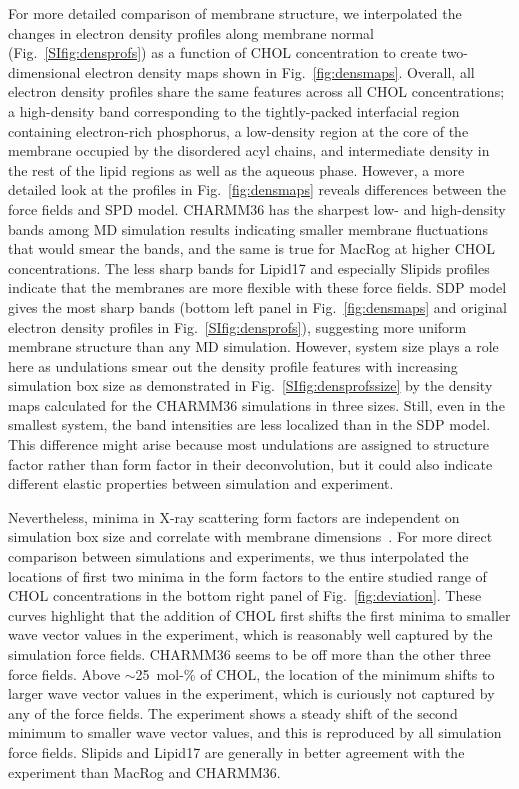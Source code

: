 \documentclass[journal=jctcce]{achemso}
\begin{document}
For more detailed comparison of membrane structure, we interpolated the changes in electron density profiles along membrane normal (Fig.~\ref{SIfig:densprofs}) as a function of CHOL concentration to create two-dimensional electron density maps shown in Fig.~\ref{fig:densmaps}. Overall, all electron density profiles share the same features across all CHOL concentrations; a high-density band corresponding to the tightly-packed interfacial region containing electron-rich phosphorus, a low-density region at the core of the membrane occupied by the disordered acyl chains, and intermediate density in the rest of the lipid regions as well as the aqueous phase. However, a more detailed look at the profiles in Fig.~\ref{fig:densmaps} reveals differences between the force fields and SPD model. CHARMM36 has the sharpest low- and high-density bands among MD simulation results indicating smaller membrane fluctuations that would smear the bands, and the same is true for MacRog at higher CHOL concentrations. The less sharp bands for Lipid17 and especially Slipids profiles indicate that the membranes are more flexible with these force fields. SDP model gives the most sharp bands (bottom left panel in Fig.~\ref{fig:densmaps} and original electron density profiles in Fig.~\ref{SIfig:densprofs}), suggesting more uniform membrane structure than any MD simulation. However, system size plays a role here as  undulations smear out the density profile features with increasing simulation box size as demonstrated in Fig.~\ref{SIfig:densprofssize} by the density maps calculated for the CHARMM36 simulations in three sizes.  Still, even in the smallest system, the band intensities are less localized than in the SDP model. This difference might arise because most undulations are assigned to structure factor rather than form factor in their deconvolution, but it could also indicate different elastic properties between simulation and experiment.

Nevertheless, minima in X-ray scattering form factors are independent on simulation box size and correlate with membrane dimensions~\cite{NMRlipidsDatabank}. For more direct comparison between simulations and experiments, we thus interpolated the locations of first two minima in the form factors to the entire studied range of CHOL concentrations in the bottom right panel of Fig.~\ref{fig:deviation}. These curves highlight that the addition of CHOL first shifts the first minima to smaller wave vector values in the experiment, which is reasonably well captured by the simulation force fields. CHARMM36 seems to be off more than the other three force fields. Above $\sim$25~mol-\% of CHOL, the location of the minimum shifts to larger wave vector values in the experiment, which is curiously not captured by any of the force fields. The experiment shows a steady shift of the second minimum to smaller wave vector values, and this is reproduced by all simulation force fields. Slipids and Lipid17 are generally in better agreement with the experiment than MacRog and CHARMM36.
\end{document}
